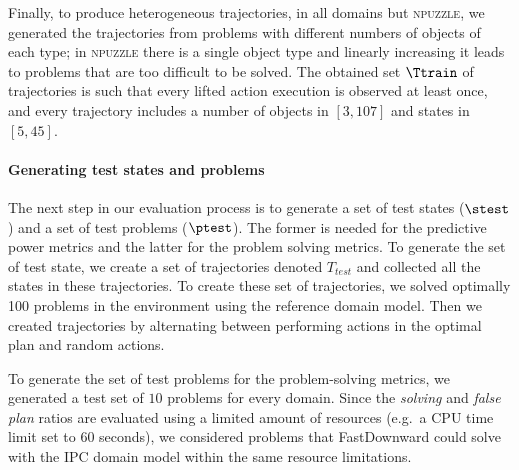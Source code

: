 %
Finally, to produce heterogeneous trajectories, in all domains but \textsc{npuzzle}, we generated the trajectories from problems with different numbers of objects of each type; in \textsc{npuzzle} there is a single object type and linearly increasing it leads to problems that are too difficult to be solved. 
%
The obtained set $\Ttrain$ of trajectories is such that every lifted action execution is observed at least once, and every trajectory includes a number of objects in $[3, 107]$ and states in $[5, 45]$\footnotemark[3].



\paragraph{Generating test states and problems}
The next step in our evaluation process is to generate a set of test states ($\stest$) and a set of test problems ($\ptest$). The former is needed for the predictive power metrics and the latter for the problem solving metrics. 
To generate the set of test state, we create a set of trajectories denoted $T_{test}$ and collected all the states in these trajectories. 
To create these set of trajectories, we solved optimally 100 problems in the environment using the reference domain model. Then we created trajectories by alternating between performing actions in the optimal plan and random actions. 

%
To generate the set of test problems for the problem-solving metrics, we generated a test set \ptest of $10$ problems for every domain. Since the \emph{solving} and \emph{false plan} ratios are evaluated using a limited amount of resources (e.g.\ a CPU time limit set to $60$ seconds), we considered problems that FastDownward could solve with the IPC domain model within the same resource limitations.


